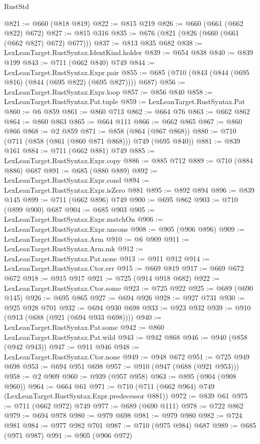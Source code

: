 \begin{lexlean}{RustStd}
\begin{coremodule}
{\begin{coremodule}
{{{{{{{{{{{{{{{{{{{{@821 := @660 (@818 @819)
@822 := @815 @219
@826 := @660 (@661 (@662 @822) @672)
@827 := @815 @316
@835 := @676 (@821 (@826 (@660 (@661 (@662 @827) @672) @677)))
@837 := @813 @835 @682
@838 := LexLeanTarget.RustSyntax.IdentKind.holder
@839 := @654 @838
@840 := @839 @199
@843 := @711 (@662 @840) @749
@844 := LexLeanTarget.RustSyntax.Expr.pair
@855 := @685 (@710 (@843 (@844 (@695 @816) (@844 (@695 @822) (@695 @827)))) @687)
@856 := LexLeanTarget.RustSyntax.Expr.loop
@857 := @856 @840
@858 := LexLeanTarget.RustSyntax.Pat.tuple
@859 := LexLeanTarget.RustSyntax.Pat
@860 := @6 @859
@861 := @860 @713
@862 := @664 @76
@863 := @662 @862
@864 := @860 @863
@865 := @664 @111
@866 := @662 @865
@867 := @860 @866
@868 := @2 @859
@871 := @858 (@864 (@867 @868))
@880 := @710 (@711 (@858 (@861 (@860 @871 @868))) @749 (@695 @840))
@881 := @839 @161
@884 := @711 (@662 @881) @749
@885 := LexLeanTarget.RustSyntax.Expr.copy
@886 := @885 @712
@889 := @710 (@884 @886) @687
@891 := @685 (@880 @889)
@892 := LexLeanTarget.RustSyntax.Expr.cond
@894 := LexLeanTarget.RustSyntax.Expr.isZero @881
@895 := @892 @894
@896 := @839 @145
@899 := @711 (@662 @896) @749
@900 := @695 @862
@903 := @710 (@899 @900) @687
@904 := @685 @903
@905 := LexLeanTarget.RustSyntax.Expr.matchOn
@906 := LexLeanTarget.RustSyntax.Expr.uncons
@908 := @905 (@906 @896)
@909 := LexLeanTarget.RustSyntax.Arm
@910 := @6 @909
@911 := LexLeanTarget.RustSyntax.Arm.mk
@912 := LexLeanTarget.RustSyntax.Pat.none
@913 := @911 @912
@914 := LexLeanTarget.RustSyntax.Ctor.err
@915 := @669 @819
@917 := @669 @672 @672
@918 := @915 @917
@921 := @725 (@914 @918 @682)
@922 := LexLeanTarget.RustSyntax.Ctor.some
@923 := @725 @922
@925 := @689 (@690 @145)
@926 := @695 @865
@927 := @694 @926
@928 := @927 @731
@930 := @925 @928 @701
@932 := @694 @930 @698
@933 := @923 @932
@939 := @910 (@913 (@688 (@921 (@694 @933 @698))))
@940 := LexLeanTarget.RustSyntax.Pat.some
@942 := @860 LexLeanTarget.RustSyntax.Pat.wild
@943 := @942 @868
@946 := @940 (@858 (@942 @943))
@947 := @911 @946
@948 := LexLeanTarget.RustSyntax.Ctor.none
@949 := @948 @672
@951 := @725 @949 @698
@953 := @694 @951 @698
@957 := @910 (@947 (@688 (@921 @953)))
@958 := @2 @909
@960 := @939 (@957 @958)
@963 := @895 (@904 (@908 @960))
@964 := @664 @61
@971 := @710 (@711 (@662 @964) @749 (LexLeanTarget.RustSyntax.Expr.predecessor @881))
@972 := @839 @61
@975 := @711 (@662 @972) @749
@977 := @689 (@690 @111)
@978 := @722 @862
@979 := @694 @978
@980 := @979 @698
@981 := @979 @980
@982 := @724 @981
@984 := @977 @982 @701
@987 := @710 (@975 @984) @687
@989 := @685 (@971 @987)
@991 := @905 (@906 @972)
}}}}}}}}}}}}}}}}}}}}
\end{coremodule}}
\end{coremodule}
\end{lexlean}
